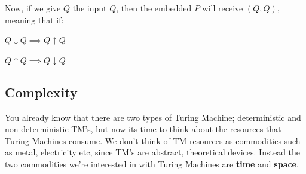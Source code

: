 Now, if we give $Q$ the input $Q$, then the embedded $P$ will receive $(Q,Q)$,
meaning that if:

\begin{description}
  \item $Q \downarrow Q \implies Q \uparrow Q$
  \item $Q \uparrow Q \implies Q \downarrow Q$
\end{description}


\subsection{Complexity}

You already know that there are two types of Turing Machine; deterministic and
non-deterministic TM's, but now its time to think about the resources that Turing
Machines consume. We don't think of TM resources as commodities such as metal,
electricity etc, since TM's are abstract, theoretical devices. Instead the two
commodities we're interested in with Turing Machines are \textbf{time} and
\textbf{space}.

